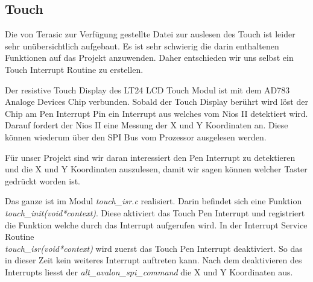 \subsection{Touch}\label{subsec:touch}
 Die von Terasic zur Verfügung gestellte Datei zur auslesen des Touch ist leider sehr unübersichtlich aufgebaut. Es ist sehr schwierig die darin enthaltenen Funktionen auf das Projekt anzuwenden. Daher entschieden wir uns selbst ein Touch Interrupt Routine zu erstellen. 
 
 Der resistive Touch Display des LT24 LCD Touch Modul ist mit dem AD783 Analoge Devices Chip verbunden. Sobald der Touch Display berührt wird löst der Chip am Pen Interrupt Pin ein Interrupt aus welches vom Nios II detektiert wird. Darauf fordert der Nios II eine Messung der X und Y Koordinaten an. Diese können wiederum über den SPI Bus vom Prozessor ausgelesen werden\cite{AD7843}. 
 
 Für unser Projekt sind wir daran interessiert den Pen Interrupt zu detektieren und die X und Y Koordinaten auszulesen, damit wir sagen können welcher Taster gedrückt worden ist.
 
Das ganze ist im Modul \textit{touch\_isr.c} realisiert. Darin befindet sich eine Funktion \\ \textit{touch\_init(void*context)}. Diese aktiviert das Touch Pen Interrupt  und registriert die Funktion welche durch das Interrupt aufgerufen wird. 
In der Interrupt Service Routine\\ \textit{touch\_isr(void*context)} wird zuerst das Touch Pen Interrupt  deaktiviert. So das in dieser Zeit kein weiteres Interrupt auftreten kann. Nach dem deaktivieren des Interrupts liesst der \textit{alt\_avalon\_spi\_command} die X und Y Koordinaten aus.